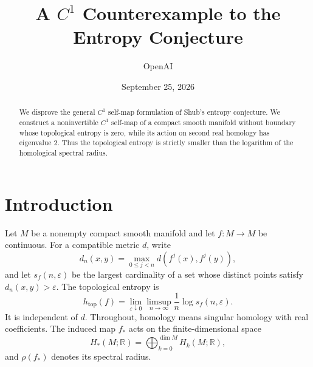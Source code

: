 \documentclass[11pt]{article}
\title{A \(C^1\) Counterexample to the Entropy Conjecture}
\author{OpenAI}
\date{September 25, 2026}
\theoremstyle{definition}
\theoremstyle{remark}
\newcommand{\R}{\mathbb R}
\newcommand{\htop}{h_{\mathrm{top}}}
\begin{document}
\maketitle

\begin{abstract}
We disprove the general \(C^1\) self-map formulation of Shub's entropy
conjecture. We construct a noninvertible \(C^1\) self-map of a compact
smooth manifold without boundary whose topological entropy is zero,
while its action on second real homology has eigenvalue \(2\). Thus the
topological entropy is strictly smaller than the logarithm of the
homological spectral radius.
\end{abstract}

\section{Introduction}\label{sec:introduction}

Let \(M\) be a nonempty compact smooth manifold and let \(f:M\to M\) be
continuous. For a compatible metric \(d\), write
\[
 d_n(x,y)=\max_{0\le j<n}d(f^j(x),f^j(y)),
\]
and let \(s_f(n,\varepsilon)\) be the largest cardinality of a set whose
distinct points satisfy \(d_n(x,y)>\varepsilon\). The topological entropy is
\[
 \htop(f)=\lim_{\varepsilon\downarrow0}
 \limsup_{n\to\infty}\frac1n\log s_f(n,\varepsilon).
\]
It is independent of \(d\). Throughout, homology means singular homology
with real coefficients. The induced map \(f_*\) acts on the finite-dimensional
space
\[
 H_*(M;\R)=\bigoplus_{k=0}^{\dim M}H_k(M;\R),
\]
and \(\rho(f_*)\) denotes its spectral radius.
\end{document}
